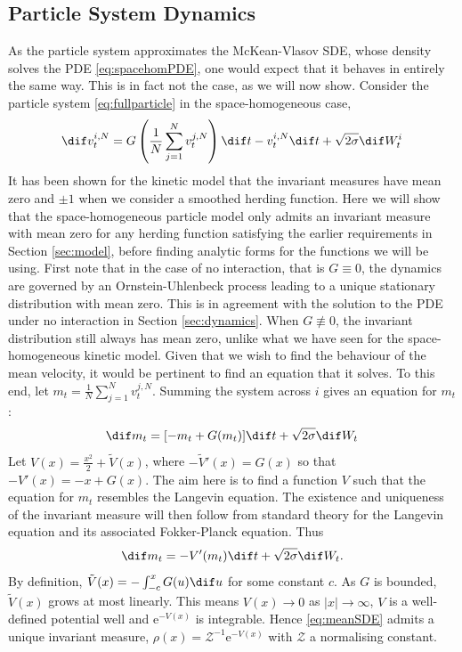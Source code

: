\subsection{Particle System Dynamics}\label{sec:particledynamics}
    As the particle system approximates the McKean-Vlasov SDE, whose density solves the PDE \eqref{eq:spacehomPDE}, one would expect that it behaves in entirely the same way. This is in fact not the case, as we will now show. Consider the particle system \eqref{eq:fullparticle} in the space-homogeneous case,
        \begin{equation}\label{eq:homparticle}
            \dif v^{i,N}_t = G\left(\frac{1}{N}\sum_{j=1}^N v^{j,N}_t\right)\dif t-v^{i,N}_t \dif t + \sqrt{2\sigma} \dif W^i_t
        \end{equation}
        It has been shown for the kinetic model that the invariant measures have mean zero and $\pm 1$ when we consider a smoothed herding function. Here we will show that the space-homogeneous particle model only admits an invariant measure with mean zero for any herding function satisfying the earlier requirements in Section \ref{sec:model}, before finding analytic forms for the functions we will be using. First note that in the case of no interaction, that is $G\equiv 0$, the dynamics are governed by an Ornstein-Uhlenbeck process leading to a unique stationary distribution with mean zero. This is in agreement with the solution to the PDE under no interaction in Section \ref{sec:dynamics}. When $G\not\equiv 0$, the invariant distribution still always has mean zero, unlike what we have seen for the space-homogeneous kinetic model. Given that we wish to find the behaviour of the mean velocity, it would be pertinent to find an equation that it solves. To this end, let $m_t = \frac{1}{N}\sum_{j=1}^N v^{j,N}_t$. Summing the system across $i$ gives an equation for $m_t$:
        \[
            \dif m_t = \lbrack -m_t + G(m_t)\rbrack \dif t +\sqrt{2\sigma}\dif W_t
        \]
        Let $V(x) = \frac{x^2}{2} + \tilde{V}(x)$, where $-\tilde{V}'(x) = G(x)$ so that $-V'(x) = -x + G(x)$. The aim here is to find a function $V$ such that the equation for $m_t$ resembles the Langevin equation. The existence and uniqueness of the invariant measure will then follow from standard theory for the Langevin equation and its associated Fokker-Planck equation. Thus
        \begin{equation}\label{eq:meanSDE}
            \dif m_t = -V'(m_t)\dif t + \sqrt{2\sigma}\dif W_t.
        \end{equation}    
        By definition, $\tilde{V}(x) = - \int_{-c}^x G(u) \dif u$ for some constant $c$. As $G$ is bounded, $\tilde{V}(x)$ grows at most linearly. This means $V(x) \to 0$ as $|x|\to \infty$, $V$ is a well-defined potential well and $\mathrm{e}^{-V(x)}$ is integrable. Hence \eqref{eq:meanSDE} admits a unique invariant measure, $\rho(x) = \mathcal{Z}^{-1}\mathrm{e}^{-V(x)}$ with $\mathcal{Z}$ a normalising constant.
        
